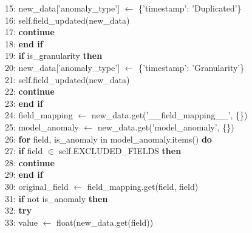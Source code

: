 \begin{breakablealgorithm}[H]
\begin{flushleft}
15: \hspace{1em} new\_data['anomaly\_type'] $\gets$ \{'timestamp': 'Duplicated'\} \\
16: \hspace{1em} self.field\_updated(new\_data) \\
17: \hspace{1em} \textbf{continue} \\
18: \hspace{0.5em} \textbf{end if} \\
19: \hspace{0.5em} \textbf{if} is\_granularity \textbf{then} \\
20: \hspace{1em} new\_data['anomaly\_type'] $\gets$ \{'timestamp': 'Granularity'\} \\
21: \hspace{1em} self.field\_updated(new\_data) \\
22: \hspace{1em} \textbf{continue} \\
23: \hspace{0.5em} \textbf{end if} \\
24: \hspace{0.5em} field\_mapping $\gets$ new\_data.get('\_\_field\_mapping\_\_', \{\}) \\
25: \hspace{0.5em} model\_anomaly $\gets$ new\_data.get('model\_anomaly', \{\}) \\
26: \hspace{0.5em} \textbf{for} field, is\_anomaly in model\_anomaly.items() \textbf{do} \\
27: \hspace{1em} \textbf{if} field $\in$ self.EXCLUDED\_FIELDS \textbf{then} \\
28: \hspace{1.5em} \textbf{continue} \\
29: \hspace{1em} \textbf{end if} \\
30: \hspace{1em} original\_field $\gets$ field\_mapping.get(field, field) \\
31: \hspace{1em} \textbf{if} not is\_anomaly \textbf{then} \\
32: \hspace{1.5em} \textbf{try} \\
33: \hspace{2em} value $\gets$ float(new\_data.get(field)) \\

\end{flushleft}
\end{breakablealgorithm}
